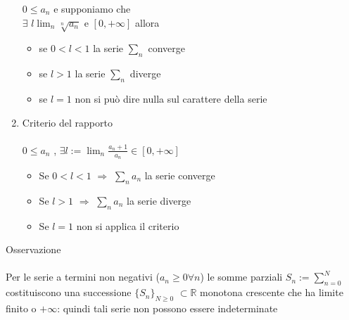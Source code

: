 \documentclass{article}
\begin{document}
\begin{enumerate}
    \(0\le a_n\) e supponiamo che \\
    \(\exists\) \( l \lim_n  \sqrt[n]{a_n}\) e \([0,+\infty]\) allora\\
    \begin{itemize}
        \item se \(0<l<1\) la serie \(\sum_n\) converge
        \item se \(l>1\) la serie \(\sum_n\) diverge
        \item se \(l=1\) non si può dire nulla sul carattere della serie
    \end{itemize}
    \item Criterio del rapporto\\\\
    \(0\le a_n\) , \(\exists l:=\lim_n \frac{a_n+1}{a_n} \in [0,+\infty]\)\\
    \begin{itemize}
        \item Se \(0<l<1\) \(\Rightarrow\)  \(\sum_n a_n \) la serie converge
        \item Se \(l>1\) \(\Rightarrow\)  \(\sum_n a_n \) la serie diverge
        \item Se \(l=1\) non si applica il criterio
    \end{itemize}
\end{enumerate} 
{\large Osservazione}\\\\
Per le serie a termini non negativi (\(a_n\ge 0 \forall n\)) le somme parziali \(S_n:=\sum^N_{n=0}\) costituiscono una successione \(\{S_n\}_{N\ge0}\) \(\subset \mathbb{R}\) monotona crescente che ha limite finito o \(+\infty\): quindi tali serie non possono essere indeterminate
\end{document}
